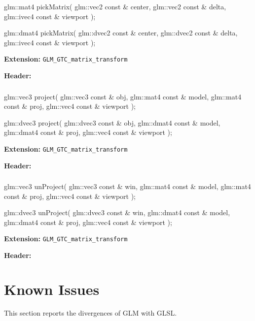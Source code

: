 \documentclass{scrartcl}
\numberwithin{figure}{subsection}
\begin{document}
\begin{cppcode}
glm::mat4 pickMatrix(
  glm::vec2 const & center, 
  glm::vec2 const & delta, 
  glm::ivec4 const & viewport
);

glm::dmat4 pickMatrix(
  glm::dvec2 const & center, 
  glm::dvec2 const & delta, 
  glm::ivec4 const & viewport
);
\end{cppcode}

\textbf{Extension:} \verb|GLM_GTC_matrix_transform|

\textbf{Header:} 

\subsubsection{}

\begin{cppcode}
glm::vec3 project(
  glm::vec3 const & obj,
  glm::mat4 const & model,
  glm::mat4 const & proj,
  glm::vec4 const & viewport
);

glm::dvec3 project(
  glm::dvec3 const & obj,
  glm::dmat4 const & model,
  glm::dmat4 const & proj,
  glm::vec4 const & viewport
);
\end{cppcode}

\textbf{Extension:} \verb|GLM_GTC_matrix_transform|

\textbf{Header:} 
 
\subsubsection{}

\begin{cppcode}
glm::vec3 unProject(
  glm::vec3 const & win, 
  glm::mat4 const & model, 
  glm::mat4 const & proj, 
  glm::vec4 const & viewport
);

glm::dvec3 unProject(
  glm::dvec3 const & win, 
  glm::dmat4 const & model, 
  glm::dmat4 const & proj, 
  glm::vec4 const & viewport
);
\end{cppcode}

\textbf{Extension:} \verb|GLM_GTC_matrix_transform|

\textbf{Header:} 

\section{Known Issues}
This section reports the divergences of GLM with GLSL.
\end{document}
